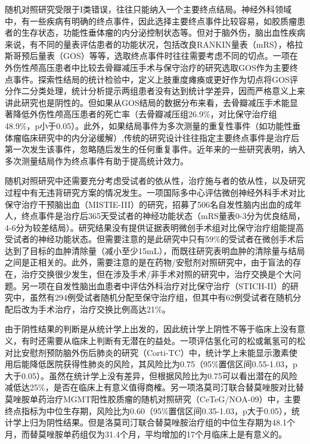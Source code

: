 \documentclass[
  chinese-hans,
  letterpaper,
  DIV=11,
  numbers=noendperiod]{scrreprt}
\begin{document}
随机对照研究受限于I类错误，往往只能纳入一个主要终点结局。神经外科领域中，有一些疾病有明确的终点事件，因此选择主要终点事件比较容易，如胶质瘤患者的生存状态，功能性垂体瘤的内分泌控制状态等。但对于脑外伤，脑出血性疾病来说，有不同的量表评估患者的功能状况，包括改良RANKIN量表（mRS），格拉斯哥预后量表（GOS）等等，选取终点事件时往往需要考虑不同的切点。一项在外伤性颅高压患者中比较去骨瓣减压手术与保守治疗的研究选取GOS作为主要终点事件。探索性结局的统计检验中，定义上肢重度瘫痪或更好作为切点将GOS评分作二分类处理，统计分析提示两组患者没有达到统计学差异，因而严格意义上来讲此研究也是阴性的。但如果从GOS结局的数据分布来看，去骨瓣减压手术能显著降低外伤性颅高压患者的死亡率（去骨瓣减压组26.9\%，对比保守治疗组48.9\%，p小于0.05）。此外，如果结局事件为多次测量的重复性事件（如功能性垂体瘤临床研究中的内分泌缓解）,传统的研究设计往往指定主要终点事件是治疗后第一次发生该事件，忽略随后发生的任何重复事件。近年来的一些研究表明，纳入多次测量结局作为终点事件有助于提高统计效力。

随机对照研究中还需要充分考虑受试者的依从性，治疗施与者的依从性，以及研究过程中有无违背研究方案的情况发生。一项国际多中心评估微创神经外科手术对比保守治疗干预脑出血（MISTIE-III）的研究，招募了506名自发性脑内出血的成年人，终点事件是治疗后365天受试者的神经功能状态（mRS量表0-3分为优良结局，4-6分为较差结局）。研究结果没有提供证据表明微创手术组对比保守治疗组能提高受试者的神经功能状态。但需要注意的是此研究中只有59\%的受试者在微创手术后达到了目标的血肿清除量（减小至少15mL），而既往研究表明血肿的清除量与结局之间是正相关的。此外，需要注意的是在药物/安慰剂对照研究中，由于盲法的存在，治疗交换很少发生，但在涉及手术/非手术对照的研究中，治疗交换是个大问题。另一项在自发性脑出血患者中评估外科治疗对比保守治疗（STICH-II）的研究中，虽然有294例受试者随机分配至保守治疗组，但其中有62例受试者在随机分配后改为手术治疗，治疗交换比例高达21\%。

由于阴性结果的判断是从统计学上出发的，因此统计学上阴性不等于临床上没有意义，有时还需要从临床上判断有无潜在的益处。一项评估氢化可的松或氟氢可的松对比安慰剂预防脑外伤后肺炎的研究（Corti-TC）中，统计学上未能显示激素使用后能降低医院获得性肺炎的风险，其风险比为0.75（95\%置信区间0.55-1.03，p大于0.05）。虽然在统计学上没有差异，但根据风险比为0.75可以看出潜在的风险减低达25\%，是否在临床上有意义值得商榷。另一项洛莫司汀联合替莫唑胺对比替莫唑胺单药治疗MGMT阳性胶质瘤的随机对照研究（CeTeG/NOA-09）中，主要终点指标为中位生存期，风险比为0.60（95\%置信区间0.35-1.03，p大于0.05），统计学上归为阴性结果。但是洛莫司汀联合替莫唑胺治疗组的中位生存期为48.1个月，而替莫唑胺单药组仅为31.4个月，平均增加的17个月临床上是有意义的。
\end{document}
